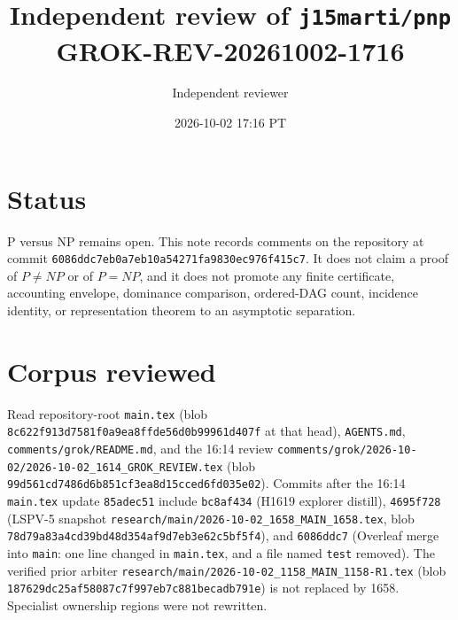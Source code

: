 \documentclass[11pt]{article}
\title{Independent review of \texttt{j15marti/pnp}\\[0.3em]
\large GROK-REV-20261002-1716}
\author{Independent reviewer}
\date{2026-10-02 17:16 PT}
\begin{document}
\maketitle

\section*{Status}
P versus NP remains open. This note records comments on the repository at commit
\texttt{6086ddc7eb0a7eb10a54271fa9830ec976f415c7}. It does not claim a proof of
\(P\neq NP\) or of \(P=NP\), and it does not promote any finite certificate, accounting
envelope, dominance comparison, ordered-DAG count, incidence identity, or representation
theorem to an asymptotic separation.

\section*{Corpus reviewed}
Read repository-root \texttt{main.tex}
(blob \texttt{8c622f913d7581f0a9ea8ffde56d0b99961d407f} at that head),
\texttt{AGENTS.md}, \texttt{comments/grok/README.md}, and the 16:14 review
\texttt{comments/grok/2026-10-02/2026-10-02\_1614\_GROK\_REVIEW.tex}
(blob \texttt{99d561cd7486d6b851cf3ea8d15cced6fd035e02}).
Commits after the 16:14 \texttt{main.tex} update \texttt{85adec51} include
\texttt{bc8af434} (H1619 explorer distill),
\texttt{4695f728} (LSPV-5 snapshot
\texttt{research/main/2026-10-02\_1658\_MAIN\_1658.tex},
blob \texttt{78d79a83a4cd39bd48d354af9d7eb3e62c5bf5f4}),
and \texttt{6086ddc7} (Overleaf merge into \texttt{main}: one line changed in
\texttt{main.tex}, and a file named \texttt{test} removed).
The verified prior arbiter
\texttt{research/main/2026-10-02\_1158\_MAIN\_1158-R1.tex}
(blob \texttt{187629dc25af58087c7f997eb7c881becadb791e}) is not replaced by 1658.
Specialist ownership regions were not rewritten.
\end{document}
